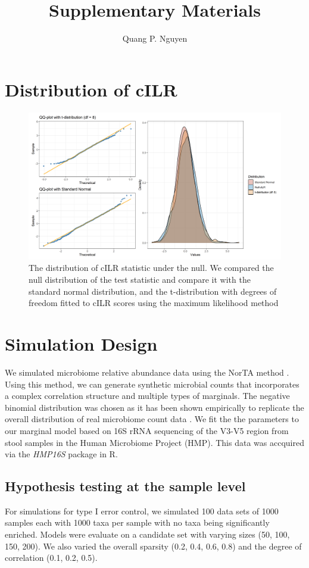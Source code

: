 \documentclass{article}
\author{Quang P. Nguyen}
\title{Supplementary Materials}
\begin{document}
\maketitle

\section{Distribution of cILR}
\begin{figure}[h]
    \centering
    \includegraphics[width=0.8\linewidth]{figures/null_distribution.png}
    \caption{The distribution of cILR statistic under the null. We compared the null distribution of the test statistic and compare it with the standard normal distribution, and the t-distribution with degrees of freedom fitted to cILR scores using the maximum likelihood method}
\end{figure}

\section{Simulation Design}
We simulated microbiome relative abundance data using the NorTA method \cite{cario}. Using this method, we can generate synthetic microbial counts that incorporates a complex correlation structure and multiple types of marginals. The negative binomial distribution was chosen as it has been shown empirically to replicate the overall distribution of real microbiome count data \cite{kurtz2015,calgaro2020}. We fit the the parameters to our marginal model based on 16S rRNA sequencing of the V3-V5 region from stool samples in the Human Microbiome Project (HMP). This data was accquired via the \emph{HMP16S} package in R\cite{schiffer2019}.  

\subsection{Hypothesis testing at the sample level}
\noindent For simulations for type I error control, we simulated 100 data sets of 1000 samples each with 1000 taxa per sample with no taxa being significantly enriched. Models were evaluate on a candidate set with varying sizes (50, 100, 150, 200). We also varied the overall sparsity (0.2, 0.4, 0.6, 0.8) and the degree of correlation (0.1, 0.2, 0.5). \\
\end{document}
